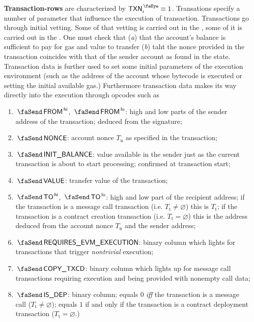 \textbf{Transaction-rows} are characterized by $\peekTransaction_{i} \equiv 1$.
Transations specify a number of parameter that influence the execution of transaction.
Transactions go through initial vetting.
Some of that vetting is carried out in the \hubMod{}, some of it is carried out in the \txnDataMod{}.
One must check that
(\emph{a}) that the account's balance is sufficient to pay for gas and value to transfer
(\emph{b}) taht the nonce provided in the transaction coincides with that of the sender account as found in the state.
Transaction data is further used to set some initial parameters of the execution environment (such as the address of the account whose bytecode is executed or setting the initial available gas.)
Furthermore transaction data makes its way directly into the execution through opcodes such as \inst{}
\begin{enumerate}
	\item $\txFrom\high$, $\txFrom\low$:
		\godGiven{}
		high and low parts of the sender address of the transaction; deduced from the signature;
	\item $\txNonce$:
		\godGiven{}
		account nonce $T_\text{n}$ as specified in the transaction;
	\item $\txInitialBalance$:
		\markAsJustifiedHere{}
		\godGiven{}
		value available in the sender just as the current transaction is about to start processing; confirmed at transaction start;
	\item $\txValue$:
		\godGiven{}
		transfer value of the transaction;
	\item $\txTo\high$, $\txTo\low$:
		\godGiven{}
		high and low part of the recipient address;
		if the transaction is a message call transaction (i.e. $T_{\text{t}} \neq \varnothing$) this is $T_{\text{t}}$;
		if the transaction is a contract creation transaction (i.e. $T_{\text{t}} = \varnothing$) this is the address deduced from the account nonce $T_\text{n}$ and the sender address;
	\item $\txRequiresEvmExecution$:
		\markAsPartiallyJustifiedHere{}
		\godGiven{}
		binary column which lights for transactions that trigger \emph{nontrivial} \evm{} execution;
	\item $\txCopyTxcd$:
		\godGiven{}
		binary column which lights up for message call transactions requiring \evm{} execution and being provided with nonempty call data;
	\item $\txIsDeployment$:
		\godGiven{}
		binary column; equals $0$ \emph{iff} the transaction is a message call ($T_\text{t} \neq \varnothing$); equals $1$ if and only if the transaction is a contract deployment transaction ($T_{\text{t}} = \varnothing$.)

\end{enumerate}
